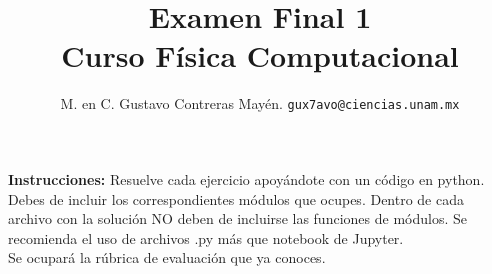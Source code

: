 

\author{M. en C. Gustavo Contreras Mayén. \texttt{gux7avo@ciencias.unam.mx}}
\title{Examen Final 1 \\ {\large Curso Física Computacional}}
\date{ }


\maketitle
\fontsize{14}{14}\selectfont

\textbf{Instrucciones: } Resuelve cada ejercicio apoyándote con un código en python. Debes de incluir los correspondientes módulos que ocupes. Dentro de cada archivo con la solución NO deben de incluirse las funciones de módulos. Se recomienda el uso de archivos .py más que notebook de Jupyter.
\\
\noindent
Se ocupará la rúbrica de evaluación que ya conoces.

